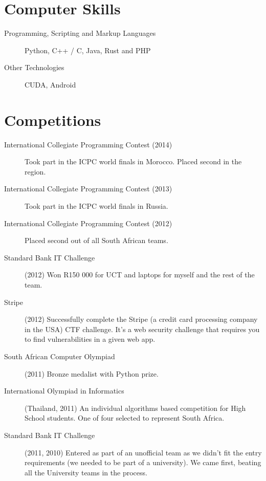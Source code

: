\documentclass[margin,line,a4paper]{resume}
\begin{document}
\begin{resume}
        \section{\mysidestyle Computer Skills}
            \begin{description}
                \item [Programming, Scripting and Markup Languages] Python, C++ / C, Java, Rust and PHP
                \item [Other Technologies] CUDA, Android
            \end{description}

        \section{\mysidestyle Competitions}
            \begin{description}
                \item [International Collegiate Programming Contest (2014)] Took part in the ICPC world finals in Morocco. Placed second in the region.
                \item [International Collegiate Programming Contest (2013)] Took part in the ICPC world finals in Russia.
                \item [International Collegiate Programming Contest (2012)] Placed second out of all South African teams.
                \item [Standard Bank IT Challenge] (2012) Won R150 000 for UCT and laptops for myself and the rest of the team.
                \item [Stripe] (2012) Successfully complete the Stripe (a credit card processing company in the USA) CTF challenge. 
                    It's a web security challenge that requires you to find vulnerabilities in a given web app.

                \item [South African Computer Olympiad] (2011) Bronze medalist with Python prize.

                \item [International Olympiad in Informatics] (Thailand, 2011) An individual 
                algorithms based competition for High School students. One of four selected
                to represent South Africa.

                \item [Standard Bank IT Challenge] (2011, 2010) Entered as part of an unofficial team
                as we didn't fit the entry requirements (we needed to be part of a university).
                We came first, beating all the University teams in the process.


\end{description}
\end{resume}
\end{document}
